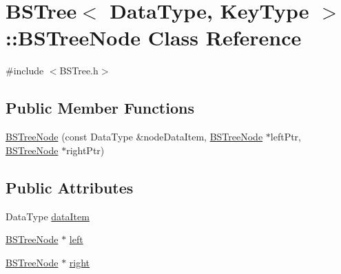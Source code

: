 \hypertarget{class_b_s_tree_1_1_b_s_tree_node}{\section{B\+S\+Tree$<$ Data\+Type, Key\+Type $>$\+:\+:B\+S\+Tree\+Node Class Reference}
\label{class_b_s_tree_1_1_b_s_tree_node}
}


{\ttfamily \#include $<$B\+S\+Tree.\+h$>$}

\subsection*{Public Member Functions}
\begin{DoxyCompactItemize}
\item 
\hyperlink{class_b_s_tree_1_1_b_s_tree_node_a40f0e1ccea243f6d47b5c1b0a2913ff8}{B\+S\+Tree\+Node} (const Data\+Type \&node\+Data\+Item, \hyperlink{class_b_s_tree_1_1_b_s_tree_node}{B\+S\+Tree\+Node} $\ast$left\+Ptr, \hyperlink{class_b_s_tree_1_1_b_s_tree_node}{B\+S\+Tree\+Node} $\ast$right\+Ptr)
\end{DoxyCompactItemize}
\subsection*{Public Attributes}
\begin{DoxyCompactItemize}
\item 
Data\+Type \hyperlink{class_b_s_tree_1_1_b_s_tree_node_a507c8d6dde1b8d35d9af6b4e78f38962}{data\+Item}
\item 
\hyperlink{class_b_s_tree_1_1_b_s_tree_node}{B\+S\+Tree\+Node} $\ast$ \hyperlink{class_b_s_tree_1_1_b_s_tree_node_a7a90150dd249432e240dc363955c5ca1}{left}
\item 
\hyperlink{class_b_s_tree_1_1_b_s_tree_node}{B\+S\+Tree\+Node} $\ast$ \hyperlink{class_b_s_tree_1_1_b_s_tree_node_a8d7bfd0208a562c8b8ab332e1d796563}{right}
\end{DoxyCompactItemize}


